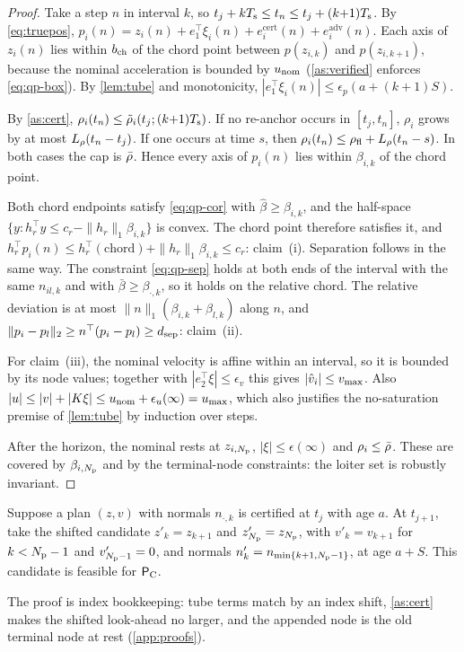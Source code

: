 \begin{proof}
Take a step $n$ in interval $k$, so $t_j+kT_{\mathrm{s}}\le t_n\le t_j+(k{+}1)T_{\mathrm{s}}$. By
\eqref{eq:truepos}, $p_i(n)=z_i(n)+e_1^\top\xi_i(n)+e^{\mathrm{cert}}_i(n)+e^{\mathrm{adv}}_i(n)$.
Each axis of $z_i(n)$ lies within $b_{\mathrm{ch}}$ of the chord point between
$p(z_{i,k})$ and $p(z_{i,k+1})$, because the nominal acceleration is bounded by
$u_{\mathrm{nom}}$ (\cref{as:verified} enforces \eqref{eq:qp-box}). By \cref{lem:tube}
and monotonicity, $|e_1^\top\xi_i(n)|\le\epsilon_p(a+(k{+}1)S)$.

By \cref{as:cert}, $\rho_i(t_n)\le\tilde\rho_i(t_j;(k{+}1)T_{\mathrm{s}})$. If no re-anchor
occurs in $[t_j,t_n]$, $\rho_i$ grows by at most $L_{\rho}(t_n-t_j)$. If one
occurs at time $s$, then $\rho_i(t_n)\le\rho_{\mathrm{fl}}+L_{\rho}(t_n-s)$. In both cases
the cap is $\bar\rho$. Hence every axis of $p_i(n)$ lies within $\beta_{i,k}$
of the chord point.

Both chord endpoints satisfy \eqref{eq:qp-cor} with
$\hat\beta\ge\beta_{i,k}$, and the half-space $\{y:h_r^\top y\le
c_r-\|h_r\|_1\beta_{i,k}\}$ is convex. The chord point therefore satisfies it,
and $h_r^\top p_i(n)\le h_r^\top(\text{chord})+\|h_r\|_1\beta_{i,k}\le c_r$:
claim~(i). Separation follows in the same way. The constraint
\eqref{eq:qp-sep} holds at both ends of the interval with the same $n_{il,k}$
and with $\bar\beta\ge\beta_{\cdot,k}$, so it holds on the relative chord. The
relative deviation is at most $\|n\|_1(\beta_{i,k}+\beta_{l,k})$ along $n$, and
$\|p_i-p_l\|_2\ge n^\top(p_i-p_l)\ge d_{\mathrm{sep}}$: claim~(ii).

For claim~(iii), the nominal velocity is affine within an interval, so it is
bounded by its node values; together with $|e_2^\top\xi|\le\epsilon_v$ this
gives $|\hat v_i|\le v_{\max}$. Also $|u|\le|v|+|K\xi|\le u_{\mathrm{nom}}+\epsilon_u(\infty)=u_{\max}$,
which also justifies the no-saturation premise of \cref{lem:tube} by
induction over steps.

After the horizon, the nominal rests at $z_{i,N_{\mathrm{p}}}$, $|\xi|\le\epsilon(\infty)$
and $\rho_i\le\bar\rho$. These are covered by $\beta_{i,N_{\mathrm{p}}}$ and by the
terminal-node constraints: the loiter set is robustly invariant.
\end{proof}

\begin{lemma}\label{lem:shift}
Suppose a plan $(z,v)$ with normals $n_{\cdot,k}$ is certified at $t_j$ with
age $a$. At $t_{j+1}$, take the shifted candidate $z'_k=z_{k+1}$ and
$z'_{N_{\mathrm{p}}}=z_{N_{\mathrm{p}}}$, with $v'_k=v_{k+1}$ for $k<N_{\mathrm{p}}-1$ and $v'_{N_{\mathrm{p}}-1}=0$, and
normals $n'_k=n_{\min\{k+1,N_{\mathrm{p}}-1\}}$, at age $a+S$. This candidate is feasible
for $\mathsf{P}_{\mathrm{C}}$.
\end{lemma}
\noindent The proof is index bookkeeping: tube terms match by an index
shift, \cref{as:cert} makes the shifted look-ahead no larger, and the
appended node is the old terminal node at rest (\cref{app:proofs}).

